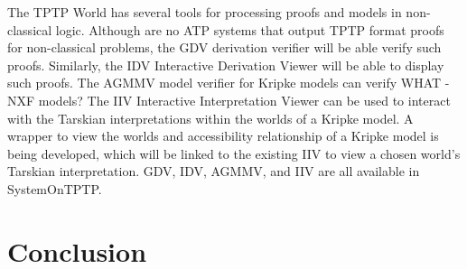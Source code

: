 \documentclass[runningheads]{llncs}
\begin{document}
The TPTP World has several tools for processing proofs and models in non-classical logic.
Although are no ATP systems that output TPTP format proofs for non-classical problems, the
GDV derivation verifier \cite{Sut06} will be able verify such proofs.
Similarly, the IDV Interactive Derivation Viewer \cite{TPS07} will be able to display such proofs.
The AGMMV model verifier for Kripke models can verify WHAT - NXF models?
The IIV Interactive Interpretation Viewer \cite{MS23-Poster} can be used to interact with the
Tarskian interpretations within the worlds of a Kripke model. 
A wrapper to view the worlds and accessibility relationship of a Kripke model is being developed,
which will be linked to the existing IIV to view a chosen world's Tarskian interpretation.
GDV, IDV, AGMMV, and IIV are all available in SystemOnTPTP.

\section{Conclusion}
\label{Conclusion}



\end{document}
